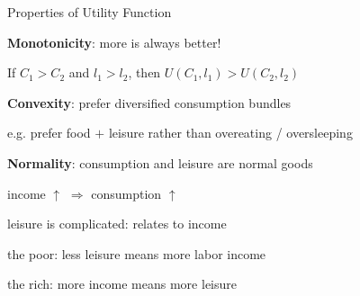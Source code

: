 \documentclass[11pt,aspectratio=169,usenames,dvipsnames]{beamer}
\let\tempone\itemize
\let\temptwo\enditemize
\renewenvironment{itemize}{\tempone\addtolength{\itemsep}{\fill}}{\temptwo}
\let\tempa\enumerate
\let\tempb\endenumerate
\renewenvironment{enumerate}{\tempa\addtolength{\itemsep}{\fill}}{\tempb}
\begin{document}
\begin{frame}{Properties of Utility Function}
\label{slide:Properties_of_Utility_Function}
    \begin{enumerate}
        \item \textbf{Monotonicity}: more is always better!
        \begin{itemize}
            \item If $ C_{1} > C_{2} $ and $ l_{1} > l_{2} $, then $ U( C_{1}, l_{1} ) > U( C_{2}, l_{2} ) $
        \end{itemize}
        \item \textbf{Convexity}: prefer \alert{diversified} consumption bundles
        \begin{itemize}
            \item e.g. prefer food $ + $ leisure rather than overeating / oversleeping
        \end{itemize}
        \item \textbf{Normality}: consumption and leisure are \alert{normal} goods
        \begin{itemize}
            \item income $ \uparrow  $ $ \Rightarrow  $ consumption $ \uparrow  $
            \item leisure is complicated: relates to income
            \begin{itemize}
                \item the poor: less leisure means \alert{more} labor income
                \item the rich: more income means \alert{more} leisure
            \end{itemize}
        \end{itemize}
    \end{enumerate}
\end{frame}
\end{document}

